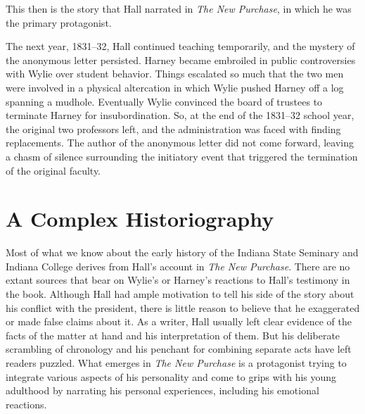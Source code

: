 \documentclass[
  american,
  letterpaper,
]{scrreprt}
\begin{document}
This then is the story that Hall narrated in \emph{The New Purchase}, in
which he was the primary protagonist.

The next year, 1831--32, Hall continued teaching temporarily, and the
mystery of the anonymous letter persisted. Harney became embroiled in
public controversies with Wylie over student behavior. Things escalated
so much that the two men were involved in a physical altercation in
which Wylie pushed Harney off a log spanning a mudhole. Eventually Wylie
convinced the board of trustees to terminate Harney for insubordination.
So, at the end of the 1831--32 school year, the original two professors
left, and the administration was faced with finding replacements. The
author of the anonymous letter did not come forward, leaving a chasm of
silence surrounding the initiatory event that triggered the termination
of the original faculty.

\section{A Complex Historiography}\label{a-complex-historiography}

Most of what we know about the early history of the Indiana State
Seminary and Indiana College derives from Hall's account in \emph{The
New Purchase}. There are no extant sources that bear on Wylie's or
Harney's reactions to Hall's testimony in the book. Although Hall had
ample motivation to tell his side of the story about his conflict with
the president, there is little reason to believe that he exaggerated or
made false claims about it. As a writer, Hall usually left clear
evidence of the facts of the matter at hand and his interpretation of
them. But his deliberate scrambling of chronology and his penchant for
combining separate acts have left readers puzzled. What emerges in
\emph{The New Purchase} is a protagonist trying to integrate various
aspects of his personality and come to grips with his young adulthood by
narrating his personal experiences, including his emotional reactions.
\end{document}
